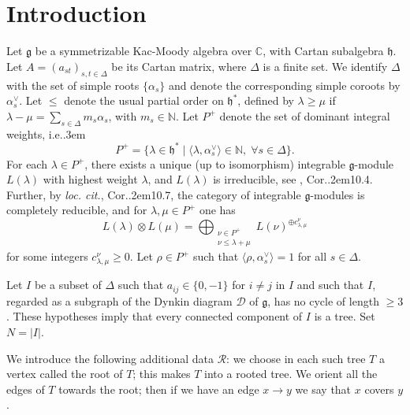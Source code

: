 \documentclass[12pt]{amsart}
\numberwithin{equation}{section}
\theoremstyle{definition}
\def\Cor{Cor.\kern.2em}
\def\ie{{i.e.}\kern.3em}
\def\loccitv{\textit{loc.\kern2pt cit.}}
\def\calR{\mathcal{R}} %
\begin{document}
\date{\today} 

\maketitle


\section{Introduction} 

Let $\mathfrak{g}$ be a symmetrizable Kac-Moody algebra over $\mathbb{C}$, with Cartan subalgebra $\mathfrak{h}$. 
Let $A = (a_{st})_{s,t\in \Delta}$ be its Cartan matrix, where $\Delta$ is a finite set. We identify $\Delta$ 
with the set of simple roots $\{\alpha_s \}$ and denote the corresponding simple coroots by $\alpha_s^\vee$. 
Let $\leq$ denote the usual partial order on $\mathfrak{h}^*$, defined by $\lambda\geq \mu$ if 
$\lambda-\mu = \sum_{s \in \Delta} m_s \alpha_s$, with $m_s \in \mathbb{N}$. 
Let $P^+$ denote the set of dominant integral weights, \ie 
\begin{equation} 
P^+ = \{\lambda \in \mathfrak{h}^* \mid \langle \lambda, \alpha_s^\vee \rangle \in \mathbb{N}, \; \forall s \in \Delta\}.
\end{equation}
For each $\lambda \in P^+$, there exists a unique (up to isomorphism) integrable $\mathfrak{g}$-module $L(\lambda)$ with 
highest weight $\lambda$, and $L(\lambda)$ is irreducible, see \cite{Ka90}, \Cor 10.4. Further, by \loccitv, \Cor 10.7, 
the category of integrable $\mathfrak{g}$-modules is completely reducible, and for $\lambda, \mu\in P^+$ 
one has 
\begin{equation} 
L(\lambda)\otimes L(\mu) = \bigoplus_{\substack{\nu\in P^+\\[3pt] \nu \leq \lambda+\mu}} L(\nu)^{\oplus c_{\lambda,\mu}^\nu}
\end{equation} 
for some integers $c_{\lambda,\mu}^\nu \geq 0$. Let $\rho \in P^+$ such that 
$\langle \rho, \alpha_s^\vee\rangle = 1$ for all $s \in \Delta$. 

\smallskip Let $I$ be a subset of $\Delta$ such that $a_{ij} \in \{0,-1\}$ for $i\not= j$ in $I$ and such that 
$I$, regarded as a subgraph of the Dynkin diagram $\mathcal{D}$ of $\mathfrak{g}$, has no cycle of length $\geq 3$. 
These hypotheses imply that every connected component of $I$ is a tree. Set $N = \vert I\vert$. 

We introduce the following additional data $\calR$: we choose in each such tree $T$ 
a vertex called the root of $T$; this makes $T$ into  a rooted tree. 
We orient all the edges of $T$ towards the root; then if we have an edge $x \to y$ we say that 
$x$ covers $y$. 
\end{document}
